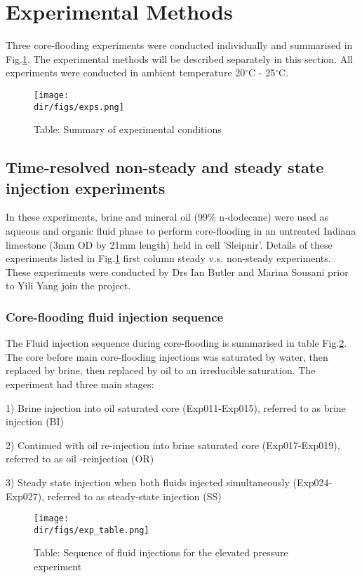 \section{Experimental Methods}
Three core-flooding experiments were conducted individually and summarised in Fig.\ref{exps}. The experimental methods will be described separately in this section. All experiments were conducted in ambient temperature 20$^{\circ}$C - 25$^{\circ}$C.

\begin{figure}[htbp]
  \centering
  \texttt{[image: \\dir/figs/exps.png]}
  \caption{Table: Summary of experimental conditions}
  \label{exps}
\end{figure}

\subsection{Time-resolved non-steady and steady state injection experiments}
In these experiments, brine and mineral oil (99\% n-dodecane) were used as aqueous and organic fluid phase to perform core-flooding in an untreated Indiana limestone (3mm OD by 21mm length) held in cell 'Sleipnir'. Details of these experiments listed in Fig.\ref{exps} first column steady v.s. non-steady experiments. These experiments were conducted by Drs Ian Butler and Marina Sousani prior to Yili Yang join the project.

\subsubsection{Core-flooding fluid injection sequence}
The Fluid injection sequence during core-flooding is summarised in table Fig.\ref{exptable}. The core before main core-flooding injections was saturated by water, then replaced by brine, then replaced by oil to an irreducible saturation. The experiment had three main stages:

1) Brine injection into oil saturated core (Exp011-Exp015), referred to as brine injection (BI)

2) Continued with oil re-injection into brine saturated core (Exp017-Exp019), referred to as oil -reinjection (OR)

3) Steady state injection when both fluids injected simultaneously (Exp024-Exp027), referred to as steady-state injection (SS)


\begin{figure}[htbp]
  \centering
  \texttt{[image: \\dir/figs/exp\_table.png]}
  \caption{Table: Sequence of fluid injections for the elevated pressure experiment}
  \label{exptable}
\end{figure}

